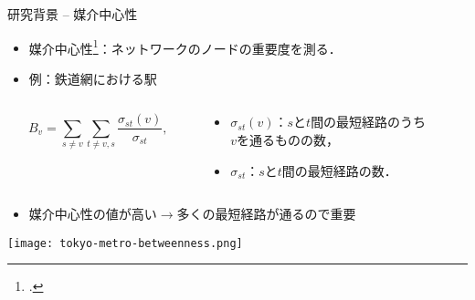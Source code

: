 \documentclass[dvipdfmx,fleqn]{beamer}
\begin{document}
\begin{frame}[t]{研究背景 -- 媒介中心性}
  \begin{itemize}
  \item \alert{媒介中心性}\footcite{05Freeman1977}：ネットワークのノードの重要度を測る．
  \item[] 例：鉄道網における駅
  \end{itemize}
  \begin{columns}
    \begin{column}{.4\textwidth}
      \begin{equation*}
        B_v=\sum_{s\neq v}\sum_{t\neq v,s}\frac{\sigma_{st}(v)}{\sigma_{st}},
      \end{equation*}
    \end{column}
    \begin{column}{.6\textwidth}
      \begin{itemize}
      \item $\sigma_{st}(v)$：$s$と$t$間の最短経路のうち\\$v$を通るものの数，
      \item $\sigma_{st}$：$s$と$t$間の最短経路の数．
      \end{itemize}
    \end{column}
  \end{columns}
  \medskip
  \begin{itemize}
  \item 媒介中心性の値が高い$\rightarrow$\alert{多くの最短経路が通る}ので重要
  \end{itemize}
  \vspace{-.5em}
  \begin{center}
    \texttt{[image: tokyo-metro-betweenness.png]}
  \end{center}
\end{frame}
\end{document}
